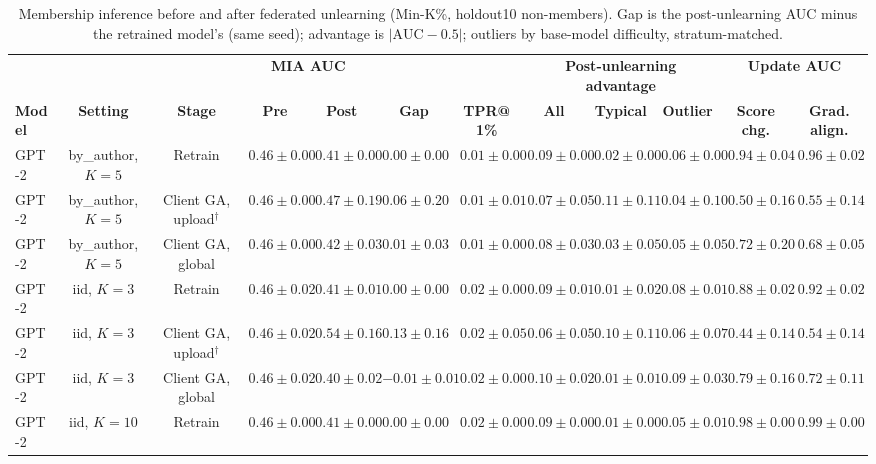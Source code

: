 \begin{table}[t]
\centering
\caption{Membership inference before and after federated unlearning (Min-K\%, holdout10 non-members). Gap is the post-unlearning AUC minus the retrained model's (same seed); advantage is $|\mathrm{AUC}-0.5|$; outliers by base-model difficulty, stratum-matched.}
\label{tab:federated-min-k-prob-holdout10}
\footnotesize
\renewcommand{\arraystretch}{1.2}
\setlength{\tabcolsep}{2pt}
\begin{tabular*}{\textwidth}{@{\extracolsep{\fill}}lccccccccccc@{}}
\toprule
 & & & \multicolumn{2}{c}{\textbf{MIA AUC}} & & & \multicolumn{3}{c}{\textbf{Post-unlearning advantage}} & \multicolumn{2}{c}{\textbf{Update AUC}} \\
\cmidrule(lr){4-5}\cmidrule(lr){8-10}\cmidrule(lr){11-12}
\textbf{Model} & \textbf{Setting} & \textbf{Stage} & \textbf{Pre} & \textbf{Post} & \textbf{Gap} & \textbf{TPR@1\%} & \textbf{All} & \textbf{Typical} & \textbf{Outlier} & \textbf{Score chg.} & \textbf{Grad. align.} \\
\midrule
GPT-2 & by\_author, $K=5$ & Retrain & $0.46 \pm 0.00$ & $0.41 \pm 0.00$ & $0.00 \pm 0.00$ & $0.01 \pm 0.00$ & $0.09 \pm 0.00$ & $0.02 \pm 0.00$ & $0.06 \pm 0.00$ & $0.94 \pm 0.04$ & $0.96 \pm 0.02$ \\
GPT-2 & by\_author, $K=5$ & Client GA, upload$^{\dagger}$ & $0.46 \pm 0.00$ & $0.47 \pm 0.19$ & $0.06 \pm 0.20$ & $0.01 \pm 0.01$ & $0.07 \pm 0.05$ & $0.11 \pm 0.11$ & $0.04 \pm 0.10$ & $0.50 \pm 0.16$ & $0.55 \pm 0.14$ \\
GPT-2 & by\_author, $K=5$ & Client GA, global & $0.46 \pm 0.00$ & $0.42 \pm 0.03$ & $0.01 \pm 0.03$ & $0.01 \pm 0.00$ & $0.08 \pm 0.03$ & $0.03 \pm 0.05$ & $0.05 \pm 0.05$ & $0.72 \pm 0.20$ & $0.68 \pm 0.05$ \\
GPT-2 & iid, $K=3$ & Retrain & $0.46 \pm 0.02$ & $0.41 \pm 0.01$ & $0.00 \pm 0.00$ & $0.02 \pm 0.00$ & $0.09 \pm 0.01$ & $0.01 \pm 0.02$ & $0.08 \pm 0.01$ & $0.88 \pm 0.02$ & $0.92 \pm 0.02$ \\
GPT-2 & iid, $K=3$ & Client GA, upload$^{\dagger}$ & $0.46 \pm 0.02$ & $0.54 \pm 0.16$ & $0.13 \pm 0.16$ & $0.02 \pm 0.05$ & $0.06 \pm 0.05$ & $0.10 \pm 0.11$ & $0.06 \pm 0.07$ & $0.44 \pm 0.14$ & $0.54 \pm 0.14$ \\
GPT-2 & iid, $K=3$ & Client GA, global & $0.46 \pm 0.02$ & $0.40 \pm 0.02$ & $-0.01 \pm 0.01$ & $0.02 \pm 0.00$ & $0.10 \pm 0.02$ & $0.01 \pm 0.01$ & $0.09 \pm 0.03$ & $0.79 \pm 0.16$ & $0.72 \pm 0.11$ \\
GPT-2 & iid, $K=10$ & Retrain & $0.46 \pm 0.00$ & $0.41 \pm 0.00$ & $0.00 \pm 0.00$ & $0.02 \pm 0.00$ & $0.09 \pm 0.00$ & $0.01 \pm 0.00$ & $0.05 \pm 0.01$ & $0.98 \pm 0.00$ & $0.99 \pm 0.00$ \\

\end{tabular*}
\end{table}
